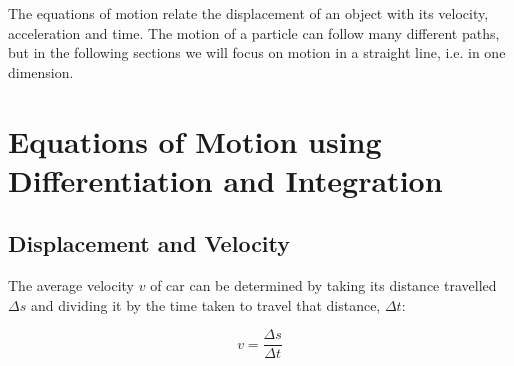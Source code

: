 






















\addtolength{\topmargin}{-0.7 cm}

\setlength{\columnsep}{22pt}


\nll

The equations of motion relate the displacement of an object with its velocity, acceleration and time. The motion of a particle can follow many different paths, but in the following sections we will focus on motion in a straight line, i.e. in one dimension. 



\section{Equations of Motion using Differentiation and Integration}

\subsection{Displacement and Velocity}

The average velocity $v$ of car can be determined by taking its distance travelled $\Delta s$ and dividing it by the time taken to travel that distance, $\Delta t$:



\begin{equation}

v = \frac{\Delta s}{\Delta t}   

\end{equation}

